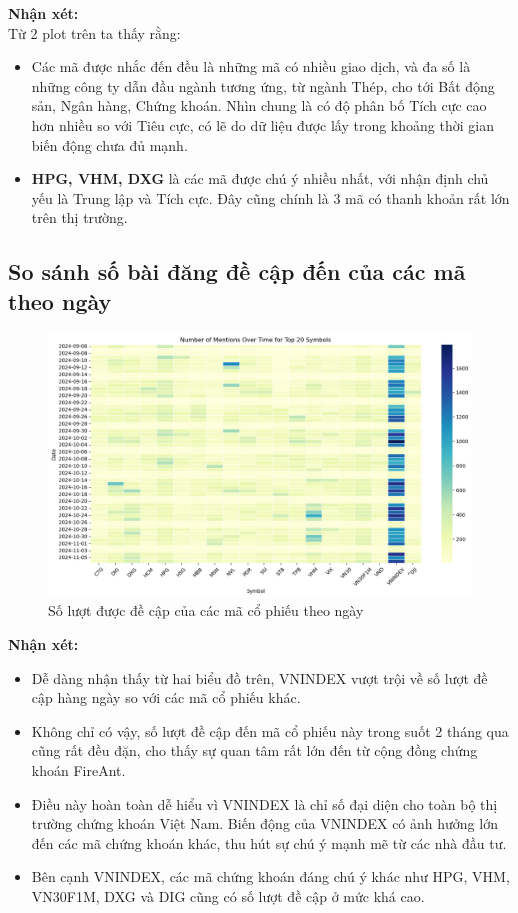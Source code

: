 \textbf{Nhận xét:}\\

Từ 2 plot trên ta thấy rằng:
\begin{itemize}
    \item Các mã được nhắc đến đều là những mã có nhiều giao dịch, và đa số là những công ty dẫn đầu ngành tương ứng, từ ngành Thép, cho tới Bất động sản, Ngân hàng, Chứng khoán. Nhìn chung là có độ phân bố Tích cực cao hơn nhiều so với Tiêu cực, có lẽ do dữ liệu được lấy trong khoảng thời gian biến động chưa đủ mạnh.
    \item \textbf{HPG, VHM, DXG} là các mã được chú ý nhiều nhất, với nhận định chủ yếu là Trung lập và Tích cực. Đây cũng chính là 3 mã có thanh khoản rất lớn trên thị trường.
\end{itemize}

\subsection{So sánh số bài đăng đề cập đến của các mã theo ngày}
\begin{figure}[H]
    \centering
    \includegraphics[width=1\linewidth]{images/plot-3.2-heatmap.png}
    \caption{Số lượt được đề cập của các mã cổ phiếu theo ngày}
    \label{fig:2.13}
\end{figure}

\textbf{Nhận xét:}
\begin{itemize}
    \item Dễ dàng nhận thấy từ hai biểu đồ trên, VNINDEX vượt trội về số lượt đề cập hàng ngày so với các mã cổ phiếu khác. 
    \item Không chỉ có vậy, số lượt đề cập đến mã cổ phiếu này trong suốt 2 tháng qua cũng rất đều đặn, cho thấy sự quan tâm rất lớn đến từ cộng đồng chứng khoán FireAnt. 
    \item Điều này hoàn toàn dễ hiểu vì VNINDEX là chỉ số đại diện cho toàn bộ thị trường chứng khoán Việt Nam. Biến động của VNINDEX có ảnh hưởng lớn đến các mã chứng khoán khác, thu hút sự chú ý mạnh mẽ từ các nhà đầu tư. 
    \item Bên cạnh VNINDEX, các mã chứng khoán đáng chú ý khác như HPG, VHM, VN30F1M, DXG và DIG cũng có số lượt đề cập ở mức khá cao. 
\end{itemize}

